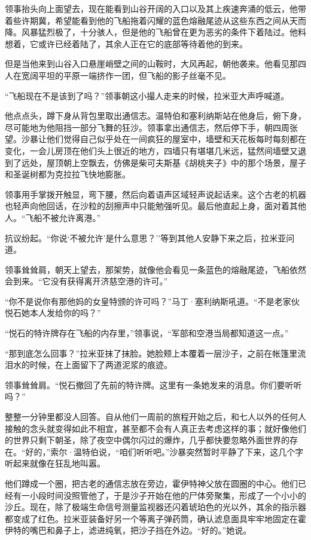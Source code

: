 \documentclass[AutoFakeBold=true]{book}
\begin{document}
领事抬头向上面望去，现在能看到山谷开阔的入口以及其上疾速奔涌的低云，他带着些许期冀，希望能看到他的飞船拖着闪耀的蓝色熔融尾迹从这些东西之间从天而降。风暴猛烈极了，十分骇人，但是他的飞船曾在更为恶劣的条件下着陆过。他料想着，它或许已经着陆了，其余人正在它的底部等待着他的到来。

但是当他来到山谷入口悬崖峭壁之间的山鞍时，大风再起，朝他袭来。他看见那四人在宽阔平坦的平原一端挤作一团，但飞船的影子丝毫不见。

``飞船现在不是该到了吗？''领事朝这小撮人走来的时候，拉米亚大声呼喊道。

他点点头，蹲下身从背包里取出通信志。温特伯和塞利纳斯站在他身后，俯下身，尽可能地为他阻挡一部分飞舞的狂沙。领事拿出通信志，然后停下手，朝四周张望。沙暴让他们觉得自己似乎处在一间疯狂的屋室中，墙壁和天花板每时每刻都在变化，一会儿房顶在他们头上很近的地方，四墙只有堪堪几米远，猛然间墙壁又退到了远处，屋顶朝上空飘去，仿佛是柴可夫斯基《胡桃夹子》中的那个场景，屋子和圣诞树都为克拉拉飞快地膨胀。

领事用手掌拨开触显，弯下腰，然后向着语声区域轻声说起话来。这个古老的机器也轻声向他回话，在沙粒的刮擦声中只能勉强听见。最后他直起上身，面对着其他人。``飞船不被允许离港。''

抗议纷起。``你说`不被允许'是什么意思？''等到其他人安静下来之后，拉米亚问道。

领事耸耸肩，朝天上望去，那架势，就像他会看见一条蓝色的熔融尾迹，飞船依然会到来。``它没有获得离开济慈空港的许可。''

``你不是说你有那他妈的女皇特颁的许可吗？''马丁·塞利纳斯吼道。``不是老家伙悦石她本人发给你的吗？''

``悦石的特许牌存在飞船的内存里，''领事说，``军部和空港当局都知道这一点。''

``那到底怎么回事？''拉米亚抹了抹脸。她脸颊上本覆着一层沙子，之前在帐篷里流泪水的时候，在上面留下了两道泥浆的痕迹。

领事耸耸肩。``悦石撤回了先前的特许牌。这里有一条她发来的消息。你们要听听吗？''

整整一分钟里都没人回答。自从他们一周前的旅程开始之后，和七人以外的任何人接触的念头就变得如此不相宜，甚至都不会有人真正去考虑这样的事；就好像他们的世界只剩下朝圣，除了夜空中偶尔闪过的爆炸，几乎都快要忽略外面世界的存在。``好的，''索尔·温特伯说，``咱们听听吧。''沙暴突然暂时平静了下来，这几个字听起来就像在狂乱地叫嚣。

他们蹲成一个圈，把古老的通信志放在旁边，霍伊特神父放在圆圈的中心。他们已经有一小段时间没照管他了，于是沙子开始在他的尸体旁聚集，形成了一个小小的沙丘。现在，除了极端生命信号测量监视器还闪着琥珀色的光以外，其余的指示器都变成了红色。拉米亚装备好另一个等离子弹药筒，确认滤息面具牢牢地固定在霍伊特的嘴巴和鼻子上，滤进纯氧，把沙子挡在外边。``好的。''她说。
\end{document}
